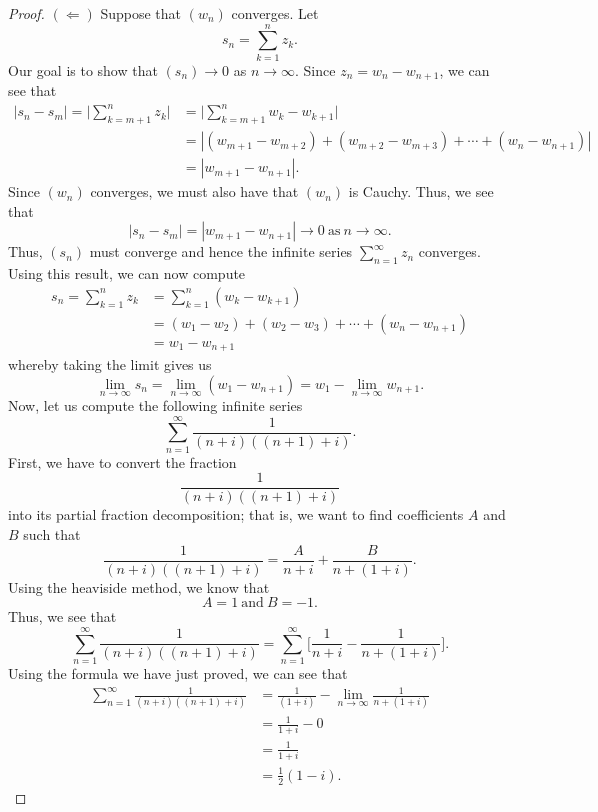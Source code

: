 \documentclass[a4paper]{article}
\begin{document}
\begin{proof}
\( (\Leftarrow) \) Suppose that \( ({w}_{n}) \) converges. Let
\[  {s}_{n} = \sum_{ k=1  }^{ n } {z}_{k}. \]
Our goal is to show that \( ({s}_{n}) \to 0  \) as \( n \to \infty  \). Since \( {z}_{n} = {w}_{n} - {w}_{n+1} \), we can see that      
\begin{align*}
    | {s}_{n} - {s}_{m} | = \Big| \sum_{ k=m+1  }^{ n } {z}_{k}  \Big| &= \Big| \sum_{ k=m+1  }^{ n } {w}_{k} - {w}_{k+1} \Big|   \\
                &= | ({w}_{m+1} - {w}_{m+2}) + ({w}_{m+2} - {w}_{m+3}) + \cdots + ({w}_{n} - {w}_{n+1}) | \\
                &= | {w}_{m+1} - {w}_{n+1} |.
\end{align*}
Since \( ({w}_{n})  \) converges, we must also have that \( ({w}_{n}) \) is Cauchy. Thus, we see that 
\[  | {s}_{n} - {s}_{m} | = | {w}_{m+1} - {w}_{n+1}  |  \to 0 \ \text{as} \ n  \to \infty.   \]
Thus, \( ({s}_{n}) \) must converge and hence the infinite series \( \sum_{ n=1  }^{ \infty  } {z}_{n}  \) converges. Using this result, we can now compute
\begin{align*}
    {s}_{n} = \sum_{ k=1  }^{ n } {z}_{k} &= \sum_{ k=1  }^{ n } ({w}_{k} - {w}_{k+1})  \\
                                          &=  ({w}_{1} - {w}_{2}) + ({w}_{2} - {w}_{3}) + \cdots + ({w}_{n} - {w}_{n+1}) \\
                                          &= {w}_{1} - {w}_{n+1}
\end{align*}
whereby taking the limit gives us
\[  \lim_{ n \to \infty  }  {s}_{n} = \lim_{ n \to \infty  }  ({w}_{1} - {w}_{n+1}) = {w}_{1} - \lim_{ n \to \infty  }  {w}_{n+1}. \]
Now, let us compute the following infinite series
\[  \sum_{ n=1  }^{  \infty  } \frac{ 1 }{ (n+i)((n+1)+i) }.  \]
First, we have to convert the fraction
\[  \frac{ 1  }{ (n+i)((n+1) + i) }  \]
into its partial fraction decomposition; that is, we want to find coefficients \( A  \) and \( B  \) such that
\[  \frac{ 1 }{ (n+i)((n+1) + i) } = \frac{ A  }{ n+ i } + \frac{ B }{ n +  (1 + i) }.  \]
Using the heaviside method, we know that 
\[ A = 1 \ \text{and} \ B = -1.   \]
Thus, we see that
\[  \sum_{ n=1  }^{ \infty  }  \frac{ 1 }{ (n+i)((n+1) + i) }  = \sum_{ n=1  }^{ \infty  }\Bigg[ \frac{ 1  }{ n+i }  - \frac{ 1  }{ n + (1+i) }  \Bigg]. \]
Using the formula we have just proved, we can see that
\begin{align*}
\sum_{ n=1 }^{ \infty  } \frac{ 1  }{  (n+i)((n+1)+i) }  &= \frac{ 1 }{ (1+i) }  - \lim_{ n \to \infty  }  \frac{ 1}{ n + (1+i) }   \\
                                                         &= \frac{ 1 }{ 1+ i } - 0 \\ 
                                                         &= \frac{ 1 }{ 1 + i  } \\
                                                         &= \frac{ 1 }{ 2 }  (1 - i).
\end{align*}
\end{proof}
\end{document}
